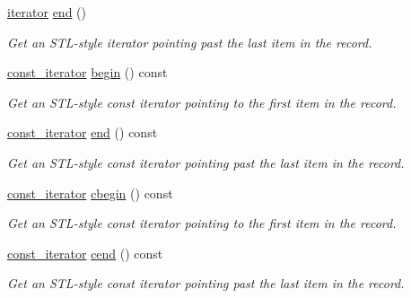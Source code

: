\begin{DoxyCompactItemize}
\hyperlink{class_mdt_1_1_plain_text_1_1_record_template_a0785bfc19bfa479d1097dbfcfdd03bef}{iterator} \hyperlink{class_mdt_1_1_plain_text_1_1_record_template_af87a170a35d825212480b33c2470f4c2}{end} ()
\begin{DoxyCompactList}\small\item\em Get an S\+T\+L-\/style iterator pointing past the last item in the record. \end{DoxyCompactList}\item 
\hyperlink{class_mdt_1_1_plain_text_1_1_record_template_a3c5cf577c8412857077b2a1f9088c1ae}{const\+\_\+iterator} \hyperlink{class_mdt_1_1_plain_text_1_1_record_template_a49e047841c96985dfd966190c29d5a1c}{begin} () const 
\begin{DoxyCompactList}\small\item\em Get an S\+T\+L-\/style const iterator pointing to the first item in the record. \end{DoxyCompactList}\item 
\hyperlink{class_mdt_1_1_plain_text_1_1_record_template_a3c5cf577c8412857077b2a1f9088c1ae}{const\+\_\+iterator} \hyperlink{class_mdt_1_1_plain_text_1_1_record_template_a34815e19f3fa3761438c3d9a7ed85625}{end} () const 
\begin{DoxyCompactList}\small\item\em Get an S\+T\+L-\/style const iterator pointing past the last item in the record. \end{DoxyCompactList}\item 
\hyperlink{class_mdt_1_1_plain_text_1_1_record_template_a3c5cf577c8412857077b2a1f9088c1ae}{const\+\_\+iterator} \hyperlink{class_mdt_1_1_plain_text_1_1_record_template_ac1e301877a9cc656b434181e685075d8}{cbegin} () const 
\begin{DoxyCompactList}\small\item\em Get an S\+T\+L-\/style const iterator pointing to the first item in the record. \end{DoxyCompactList}\item 
\hyperlink{class_mdt_1_1_plain_text_1_1_record_template_a3c5cf577c8412857077b2a1f9088c1ae}{const\+\_\+iterator} \hyperlink{class_mdt_1_1_plain_text_1_1_record_template_a2090e146d52a7f21df541720b6b3619d}{cend} () const 
\begin{DoxyCompactList}\small\item\em Get an S\+T\+L-\/style const iterator pointing past the last item in the record. \end{DoxyCompactList}\end{DoxyCompactItemize}


